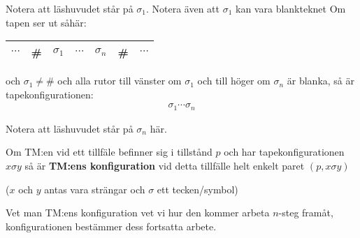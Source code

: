 \noindent Notera att läshuvudet står på $\sigma_1$. Notera även att $\sigma_1$ kan vara blankteknet
\newpage
\noindent Om tapen ser ut såhär:
\begin{center}
  \begin{tabular}{c|c|c|c|c|c|c}
    \hline
    $\cdots$&\#&$\sigma_1$&$\cdots$&$\sigma_n$&\#&$\cdots$\\
    \hline
  \end{tabular}
\end{center}\par
\noindent och $\sigma_1\neq\#$ och alla rutor till vänster om $\sigma_1$ och till höger om $\sigma_n$ är blanka, så är tapekonfigurationen:
\begin{equation*}
  \begin{gathered}
    \sigma_1\cdots\sigma_n
  \end{gathered}
\end{equation*}\par
\noindent Notera att läshuvudet står på $\sigma_n$ här.
\par\bigskip
\noindent Om TM:en vid ett tillfäle befinner sig i tillstånd $p$ och har tapekonfigurationen $x\sigma y$ så är \textbf{TM:ens konfiguration} vid detta tillfälle helt enkelt paret $(p,x\sigma y)$\par
\noindent ($x$ och $y$ antas vara strängar och $\sigma$ ett tecken/symbol)
\par\bigskip
\noindent Vet man TM:ens konfiguration vet vi hur den kommer arbeta $n$-steg framåt, konfigurationen bestämmer dess fortsatta arbete.
\par\bigskip
